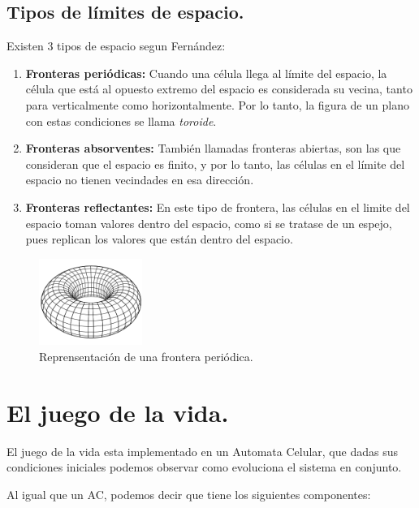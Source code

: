 \documentclass[a4paper,12pt]{article}
\newcommand{\head}[1]{{\bfseries #1}}
\begin{document}
\subsection{Tipos de límites de espacio.}
Existen 3 tipos de espacio segun Fernández\cite{cita2}:
    \begin{enumerate}
        \item \head{Fronteras periódicas:} Cuando una célula llega al límite del espacio, la célula que está
        al opuesto extremo del espacio es considerada su vecina, tanto para verticalmente como horizontalmente.
        Por lo tanto, la figura de un plano con estas condiciones se llama \emph{toroide}. 
        \item \head{Fronteras absorventes:} También llamadas fronteras abiertas\cite{cita2}, son las que consideran que el espacio es
        finito, y por lo tanto, las células en el límite del espacio no tienen vecindades en esa dirección.
        \item \head{Fronteras reflectantes:} En este tipo de frontera, las células en el limite del espacio toman
        valores dentro del espacio, como si se tratase de un espejo, pues replican los valores que están dentro del espacio.    
    \end{enumerate}
\begin{figure}[h]
    \centering
    \includegraphics[width=0.3\textwidth]{torus.png}
    \caption{Reprensentación de una frontera periódica.}
\end{figure}

\newpage
\section{El juego de la vida.}

El juego de la vida esta implementado en un Automata Celular, que dadas sus condiciones
iniciales podemos observar como evoluciona el sistema en conjunto.

Al igual que un AC, podemos decir que tiene los siguientes componentes:
\end{document}
